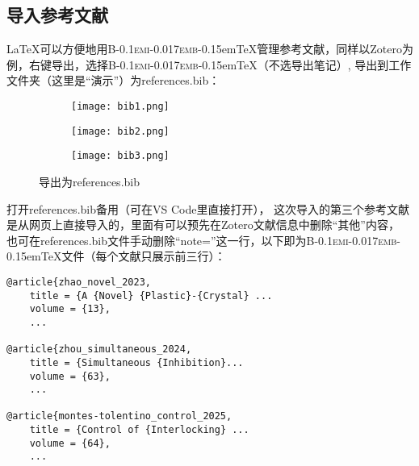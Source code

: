 \newpage

\subsection{导入参考文献}

\newcommand{\BibTeX}{\textsc{B\kern-0.1emi\kern-0.017emb}\kern-0.15em\TeX}
\LaTeX{}可以方便地用\BibTeX{}管理参考文献，同样以Zotero为例，右键导出，选择\BibTeX{}（不选导出笔记）,
导出到工作文件夹（这里是“演示”）为references.bib：

\begin{figure}[h]
    \centering
    \begin{subfigure}[c]{0.24\textwidth}
      \texttt{[image: bib1.png]}
      \label{bib 1-1}
    \end{subfigure}
    \hfill
    \begin{subfigure}[c]{0.20\textwidth}
      \texttt{[image: bib2.png]}
      \label{bib 1-2}
    \end{subfigure}
    \hfill
    \begin{subfigure}[c]{0.47\textwidth}
      \texttt{[image: bib3.png]}
      \label{bib 1-3}
    \end{subfigure}
    \caption{导出为references.bib}
    \label{bib 1}
\end{figure}

打开references.bib备用（可在VS Code里直接打开），
这次导入的第三个参考文献是从网页上直接导入的，里面有可以预先在Zotero文献信息中删除“其他”内容，
也可在references.bib文件手动删除“note=”这一行，以下即为\BibTeX{}文件（每个文献只展示前三行）：

\begin{center}
\begin{minipage}{0.8\textwidth}
    \hspace{1em}
\begin{lstlisting}[language={[LaTeX]TeX}]
@article{zhao_novel_2023,
	title = {A {Novel} {Plastic}‐{Crystal} ...
	volume = {13},
    ...

@article{zhou_simultaneous_2024,
	title = {Simultaneous {Inhibition}...
	volume = {63},
    ...

@article{montes-tolentino_control_2025,
	title = {Control of {Interlocking} ...
	volume = {64},
    ...

\end{lstlisting}
\end{minipage}
\end{center}

